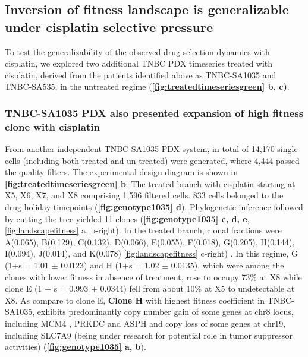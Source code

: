 
\subsection{Inversion of fitness landscape is generalizable under cisplatin selective pressure}
To test the generalizability of the observed drug selection dynamics with cisplatin, we explored two additional TNBC PDX timeseries treated with cisplatin, derived from the patients identified above as TNBC-SA1035 and TNBC-SA535, in the untreated regime  (\textbf{\autoref{fig:treatedtimeseriesgreen}  b, c)}. 

\subsubsection{TNBC-SA1035 PDX also presented expansion of high fitness clone with cisplatin}
From another independent TNBC-SA1035 PDX system, in total of 14,170 single cells (including both treated and un-treated) were generated, where 4,444 passed the quality filters. The experimental design diagram is shown in \textbf{\autoref{fig:treatedtimeseriesgreen} b}.
 The treated branch with cisplatin starting at X5, X6, X7, and X8 comprising 1,596 filtered cells. 833 cells belonged to the drug-holiday timepoints (\textbf{\autoref{fig:genotype1035} d}). Phylogenetic inference followed by cutting the tree yielded 11 clones (\textbf{\autoref{fig:genotype1035} c, d, e}, {\autoref{fig:landscapefitness} a, b-right}). In the treated branch, clonal fractions were A(0.065), B(0.129), C(0.132), D(0.066), E(0.055), F(0.018), G(0.205), H(0.144), I(0.094), J(0.014), and K(0.078) {\autoref{fig:landscapefitness} c-right}) . In this regime, G (1+s = 1.01 $\pm$ 0.0123) and H (1+s = 1.02 $\pm$ 0.0135), which were among the clones with lower fitness in absence of treatment, rose to occupy 73\% at X8 while clone E (1 + s = 0.993 $\pm$ 0.0344) fell from about 10\% at X5 to undetectable at X8. As compare to clone E,
 \textbf{Clone H} with highest fitness coefficient in TNBC-SA1035, exhibits predominantly copy number gain of some genes at chr8 locus, including MCM4 \cite {issac2019mcm2, stoeber2001dna, kwok2015prognostic}, PRKDC \cite {tan2020prkdc, sun2017prkdc, zhang2019prkdc} and ASPH and copy loss of some genes at chr19, including SLC7A9 (being under research for potential role in tumor suppressor activities) \cite {bhutia2016slc, ji2018function, broer2020amino, ganapathy2015slc5a8, gupta2006slc5a8} (\textbf{\autoref{fig:genotype1035} a, b}).
 
